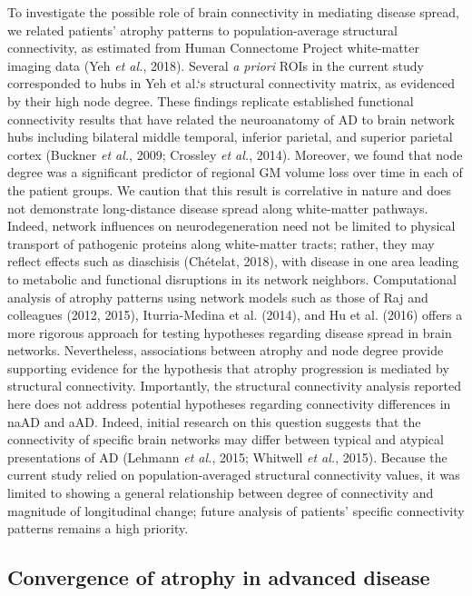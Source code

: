 \documentclass[]{article}
\begin{document}
To investigate the possible role of brain connectivity in mediating
disease spread, we related patients' atrophy patterns to
population-average structural connectivity, as estimated from Human
Connectome Project white-matter imaging data (Yeh \emph{et al.}, 2018).
Several \emph{a priori} ROIs in the current study corresponded to hubs
in Yeh et al.`s structural connectivity matrix, as evidenced by their
high node degree. These findings replicate established functional
connectivity results that have related the neuroanatomy of AD to brain
network hubs including bilateral middle temporal, inferior parietal, and
superior parietal cortex (Buckner \emph{et al.}, 2009; Crossley \emph{et
al.}, 2014). Moreover, we found that node degree was a significant
predictor of regional GM volume loss over time in each of the patient
groups. We caution that this result is correlative in nature and does
not demonstrate long-distance disease spread along white-matter
pathways. Indeed, network influences on neurodegeneration need not be
limited to physical transport of pathogenic proteins along white-matter
tracts; rather, they may reflect effects such as diaschisis (Chételat,
2018), with disease in one area leading to metabolic and functional
disruptions in its network neighbors. Computational analysis of atrophy
patterns using network models such as those of Raj and colleagues (2012,
2015), Iturria-Medina et al. (2014), and Hu et al. (2016) offers a more
rigorous approach for testing hypotheses regarding disease spread in
brain networks. Nevertheless, associations between atrophy and node
degree provide supporting evidence for the hypothesis that atrophy
progression is mediated by structural connectivity. Importantly, the
structural connectivity analysis reported here does not address
potential hypotheses regarding connectivity differences in naAD and aAD.
Indeed, initial research on this question suggests that the connectivity
of specific brain networks may differ between typical and atypical
presentations of AD (Lehmann \emph{et al.}, 2015; Whitwell \emph{et
al.}, 2015). Because the current study relied on population-averaged
structural connectivity values, it was limited to showing a general
relationship between degree of connectivity and magnitude of
longitudinal change; future analysis of patients' specific connectivity
patterns remains a high priority.

\subsection*{Convergence of atrophy in advanced
disease}\label{convergence-of-atrophy-in-advanced-disease}
\end{document}
